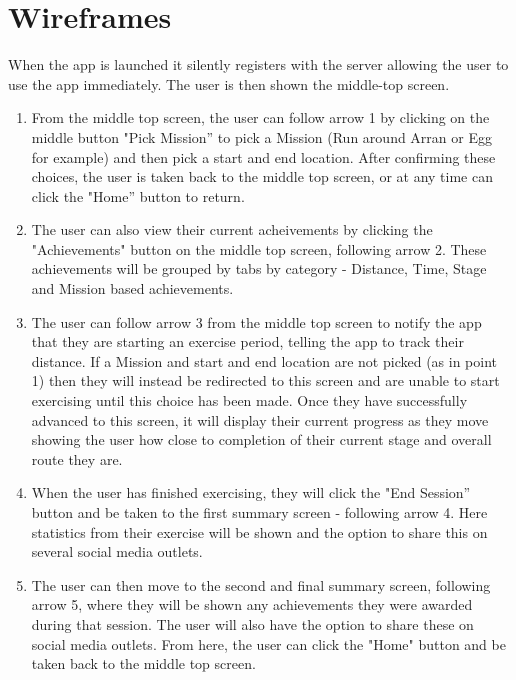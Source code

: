 \chapter{Wireframes}
\label{ch:wireframes}
When the app is launched it silently registers with the server
allowing the user to use the app immediately. The user is then shown
the middle-top screen.
\begin{enumerate}
\item From the middle top screen, the user can follow arrow 1 by
  clicking on the middle button "Pick Mission'' to pick a Mission
  (Run around Arran or Egg for example) and then pick a start and
  end location. After confirming these choices, the user is taken
  back to the middle top screen, or at any time can click the
  "Home'' button to return. 
\item The user can also view their current acheivements by clicking
  the "Achievements" button on the middle top screen, following
  arrow 2. These achievements will be grouped by tabs by category -
  Distance, Time, Stage and Mission based achievements.
\item The user can follow arrow 3 from the middle top screen to
  notify the app that they are starting an exercise period, telling
  the app to track their distance. If a Mission and start and end
  location are not picked (as in point 1) then they will instead be
  redirected to this screen and are unable to start exercising until
  this choice has been made. Once they have successfully advanced to
  this screen, it will display their current progress as they move
  showing the user how close to completion of their current stage
  and overall route they are. 
\item When the user has finished exercising, they will click the
  "End Session'' button and be taken to the first summary screen -
  following arrow 4. Here statistics from their exercise will be
  shown and the option to share this on several social media
  outlets.
\item The user can then move to the second and final summary screen,
  following arrow 5, where they will be shown any achievements they
  were awarded during that session. The user will also have the
  option to share these on social media outlets. From here, the user
  can click the "Home" button and be taken back to the middle top
  screen. 
\end{enumerate}
